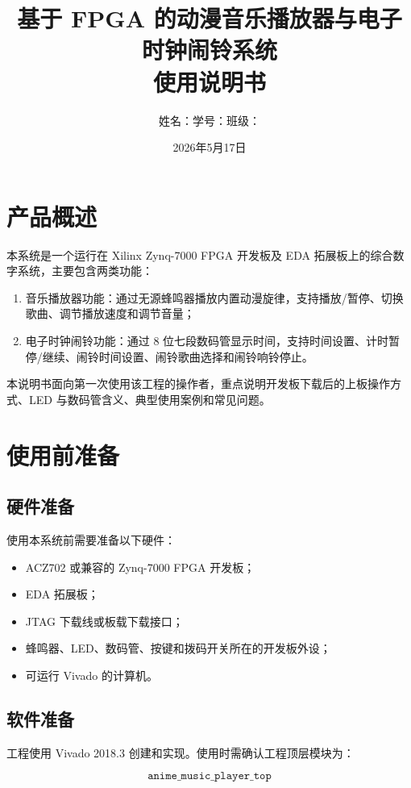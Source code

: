 \documentclass[UTF8,a4paper,12pt]{ctexart}
\title{基于 FPGA 的动漫音乐播放器与电子时钟闹铃系统\\使用说明书}
\author{姓名：\underline{\hspace{2.4cm}}\quad 学号：\underline{\hspace{3.2cm}}\quad 班级：\underline{\hspace{2.4cm}}}
\date{2026年5月17日}
\begin{document}
\maketitle

\section{产品概述}

本系统是一个运行在 Xilinx Zynq-7000 FPGA 开发板及 EDA 拓展板上的综合数字系统，主要包含两类功能：

\begin{enumerate}
  \item 音乐播放器功能：通过无源蜂鸣器播放内置动漫旋律，支持播放/暂停、切换歌曲、调节播放速度和调节音量；
  \item 电子时钟闹铃功能：通过 8 位七段数码管显示时间，支持时间设置、计时暂停/继续、闹铃时间设置、闹铃歌曲选择和闹铃响铃停止。
\end{enumerate}

本说明书面向第一次使用该工程的操作者，重点说明开发板下载后的上板操作方式、LED 与数码管含义、典型使用案例和常见问题。

\section{使用前准备}

\subsection{硬件准备}

使用本系统前需要准备以下硬件：

\begin{itemize}
  \item ACZ702 或兼容的 Zynq-7000 FPGA 开发板；
  \item EDA 拓展板；
  \item JTAG 下载线或板载下载接口；
  \item 蜂鸣器、LED、数码管、按键和拨码开关所在的开发板外设；
  \item 可运行 Vivado 的计算机。
\end{itemize}

\subsection{软件准备}

工程使用 Vivado 2018.3 创建和实现。使用时需确认工程顶层模块为：

\[
\texttt{anime\_music\_player\_top}
\]
\end{document}

